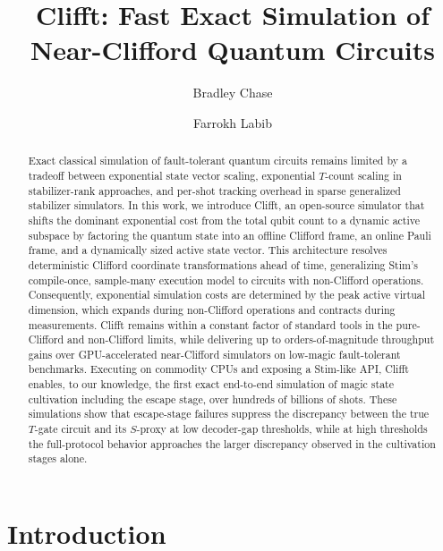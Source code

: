 \documentclass[a4paper, onecolumn, unpublished]{quantumarticle}
\begin{document}
    \title{Clifft: Fast Exact Simulation of Near-Clifford Quantum Circuits}

    \author{Bradley Chase}
    \author{Farrokh Labib}


    \maketitle

    \begin{abstract}
    Exact classical simulation of fault-tolerant quantum circuits remains limited by a tradeoff between exponential state vector scaling, exponential $T$-count scaling in stabilizer-rank approaches, and per-shot tracking overhead in sparse generalized stabilizer simulators. In this work, we introduce Clifft, an open-source simulator that shifts the dominant exponential cost from the total qubit count to a dynamic active subspace by factoring the quantum state into an offline Clifford frame, an online Pauli frame, and a dynamically sized active state vector. This architecture resolves deterministic Clifford coordinate transformations ahead of time, generalizing Stim's compile-once, sample-many execution model to circuits with non-Clifford operations. Consequently, exponential simulation costs are determined by the peak active virtual dimension, which expands during non-Clifford operations and contracts during measurements. Clifft remains within a constant factor of standard tools in the pure-Clifford and non-Clifford limits, while delivering up to orders-of-magnitude throughput gains over GPU-accelerated near-Clifford simulators on low-magic fault-tolerant benchmarks. Executing on commodity CPUs and exposing a Stim-like API, Clifft enables, to our knowledge, the first exact end-to-end simulation of magic state cultivation including the escape stage, over hundreds of billions of shots. These simulations show that escape-stage failures suppress the discrepancy between the true $T$-gate circuit and its $S$-proxy at low decoder-gap thresholds, while at high thresholds the full-protocol behavior approaches the larger discrepancy observed in the cultivation stages alone.
    \end{abstract}

    \section{Introduction}
\end{document}
